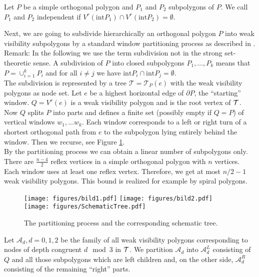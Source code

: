 \documentclass[a4paper,USenglish,numberwithinsect]{lipics}
\newcommand{\A}{\mathcal{A}}
\theoremstyle{plain}
\begin{document}
\begin{definition}
Let $P$ be a simple orthogonal polygon and  $P_1$ and $P_2$
subpolygons of $P$.
 We call $P_1$ and $P_2$  independent if  $V^r( \mbox{int}P_1)\cap V^r(\mbox{int}
P_2)=\emptyset$.
\end{definition}

Next, we are going to subdivide hierarchically an orthogonal polygon $P$
into  weak visibility subpolygons by a standard window partitioning
process as  described in \cite{BS}. \\
Remark: In the following we use the term subdivision not in the strong set-theoretic sense. A subdivision of  $P$ into closed subpolygons $P_1,\ldots ,P_k$ means that 
$P=\cup_{i=1}^kP_i$ and for all $i\not= j$ we have $\mbox{int} P_i\cap \mbox{int} P_j=\emptyset$. \\
The subdivision is
represented by a tree
${\mathcal T}={\mathcal T}_P(e)$ with the weak
 visibility polygons as node set. Let  $e$ be a highest horizontal edge
of $\partial P$, the ``starting'' window.  $Q=V^r(e)$ is a weak
visibility polygon and is the root vertex  of $\cal{T}$. Now $Q$ splits
$P$ into parts and defines a finite set (possibly empty if $Q=P$) of
vertical windows $w_1,\ldots w_k$. Each window  corresponds to a left or
right turn of a shortest orthogonal path from $e$ to the subpolygon
lying entirely behind the window. Then we recurse, see Figure \ref{partitionFigures}.\\
By the partitioning process we can obtain a linear number of subpolygons only. There are $\frac{n-4}{2}$ reflex vertices in a simple orthogonal polygon
 with $n$ vertices. Each window uses at least one reflex vertex. Therefore,
we get at most $n/2-1$ weak visibility polygons. This bound is realized for example by spiral polygons.


\begin{figure}
\centering
\texttt{[image: figures/bild1.pdf]}\quad\quad
\texttt{[image: figures/bild2.pdf]}\quad\quad
\texttt{[image: figures/SchematicTree.pdf]}
\caption{The partitioning process and the corresponding schematic tree.}
\label{partitionFigures}
\end{figure}
Let $\A_d, d=0,1,2$ be the family of all weak visibility polygons
corresponding to nodes of depth congruent $d\mod 3$ in $\cal{T}$. We
partition  $\A_d$ into $\A_d^L$ consisting of $Q$ and all those
subpolygons which are left
 children and, on the other side,  $\A_d^R$ consisting of the remaining ``right'' parts.
\end{document}

